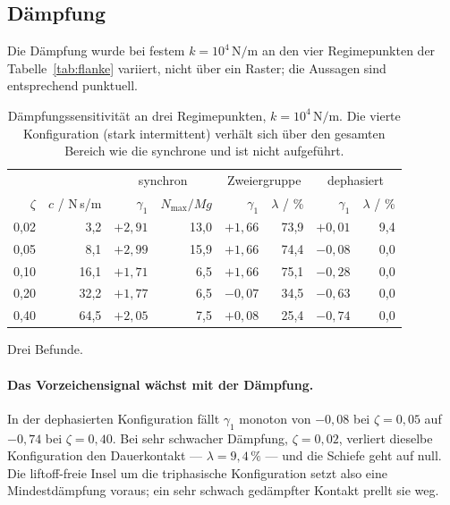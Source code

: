 \documentclass[12pt,a4paper]{report}
\begin{document}
\subsection*{Dämpfung}

Die Dämpfung wurde bei festem $k = 10^{4}\,\mathrm{N/m}$ an den vier
Regimepunkten der Tabelle~\ref{tab:flanke} variiert, nicht über ein
Raster; die Aussagen sind entsprechend punktuell.

\begin{table}[htbp]
  \centering
  \begin{tabular}{rr|rr|rr|rr}
    \hline
    & & \multicolumn{2}{c|}{synchron} & \multicolumn{2}{c|}{Zweiergruppe} & \multicolumn{2}{c}{dephasiert} \\
    $\zeta$ & $c$ / N\,s/m & $\gamma_1$ & $N_{\max}/Mg$ & $\gamma_1$ & $\lambda$ / \% & $\gamma_1$ & $\lambda$ / \% \\
    \hline
    0{,}02 &  3{,}2 & $+2{,}91$ & 13{,}0 & $+1{,}66$ & 73{,}9 & $+0{,}01$ & 9{,}4 \\
    0{,}05 &  8{,}1 & $+2{,}99$ & 15{,}9 & $+1{,}66$ & 74{,}4 & $-0{,}08$ & 0{,}0 \\
    0{,}10 & 16{,}1 & $+1{,}71$ &  6{,}5 & $+1{,}66$ & 75{,}1 & $-0{,}28$ & 0{,}0 \\
    0{,}20 & 32{,}2 & $+1{,}77$ &  6{,}5 & $-0{,}07$ & 34{,}5 & $-0{,}63$ & 0{,}0 \\
    0{,}40 & 64{,}5 & $+2{,}05$ &  7{,}5 & $+0{,}08$ & 25{,}4 & $-0{,}74$ & 0{,}0 \\
    \hline
  \end{tabular}
  \caption{Dämpfungssensitivität an drei Regimepunkten,
  $k = 10^{4}\,\mathrm{N/m}$. Die vierte Konfiguration (stark
  intermittent) verhält sich über den gesamten Bereich wie die
  synchrone und ist nicht aufgeführt.}
  \label{tab:sens-zeta}
\end{table}

Drei Befunde.

\paragraph{Das Vorzeichensignal wächst mit der Dämpfung.} In der
dephasierten Konfiguration fällt $\gamma_1$ monoton von $-0{,}08$ bei
$\zeta = 0{,}05$ auf $-0{,}74$ bei $\zeta = 0{,}40$. Bei sehr schwacher
Dämpfung, $\zeta = 0{,}02$, verliert dieselbe Konfiguration den
Dauerkontakt --- $\lambda = 9{,}4\,\%$ --- und die Schiefe geht auf
null. Die liftoff-freie Insel um die triphasische Konfiguration setzt
also eine Mindestdämpfung voraus; ein sehr schwach gedämpfter Kontakt
prellt sie weg.
\end{document}
